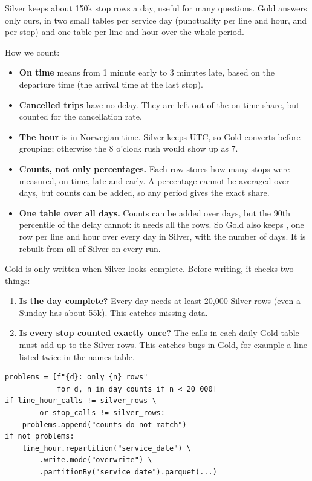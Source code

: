Silver keeps about 150k stop rows a day, useful for many questions. Gold answers only ours, in
two small tables per service day (punctuality per line and hour, and per stop) and one table
per line and hour over the whole period.

How we count:
\begin{itemize}
  \item \textbf{On time} means from 1 minute early to 3 minutes late, based on the departure
        time (the arrival time at the last stop).
  \item \textbf{Cancelled trips} have no delay. They are left out of the on-time share, but
        counted for the cancellation rate.
  \item \textbf{The hour} is in Norwegian time. Silver keeps UTC, so Gold converts before
        grouping; otherwise the 8 o'clock rush would show up as 7.
  \item \textbf{Counts, not only percentages.} Each row stores how many stops were measured, on
        time, late and early. A percentage cannot be averaged over days, but counts can be
        added, so any period gives the exact share.
  \item \textbf{One table over all days.} Counts can be added over days, but the 90th
        percentile of the delay cannot: it needs all the rows. So Gold also keeps
        , one row per line and hour over every day in
        Silver, with the number of days. It is rebuilt from all of Silver on every run.
\end{itemize}

Gold is only written when Silver looks complete. Before writing, it checks two things:
\begin{enumerate}[topsep=0.2em, itemsep=0.25em]
  \item \textbf{Is the day complete?} Every day needs at least 20{,}000 Silver rows (even a
        Sunday has about 55k). This catches missing data.
  \item \textbf{Is every stop counted exactly once?} The calls in each daily Gold table must add up
        to the Silver rows. This catches bugs in Gold, for example a line listed twice in the
        names table.
\end{enumerate}

\begin{lstlisting}
problems = [f"{d}: only {n} rows"
            for d, n in day_counts if n < 20_000]
if line_hour_calls != silver_rows \
        or stop_calls != silver_rows:
    problems.append("counts do not match")
if not problems:
    line_hour.repartition("service_date") \
        .write.mode("overwrite") \
        .partitionBy("service_date").parquet(...)
\end{lstlisting}

